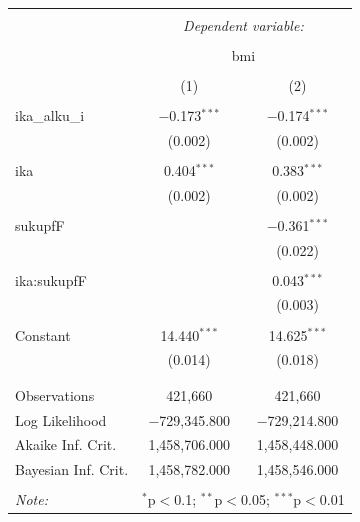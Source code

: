 \documentclass[finnish]{docopts}
\begin{document}
\nocite{*}
%
%
%




\lastpage

\appendices

\pagestyle{empty}


\begin{table}[!htbp] \centering 
  \caption{} 
  \label{} 
\begin{tabular}{@{\extracolsep{5pt}}lcc} 
\\[-1.8ex]\hline 
\hline \\[-1.8ex] 
 & \multicolumn{2}{c}{\textit{Dependent variable:}} \\ 
\cline{2-3} 
\\[-1.8ex] & \multicolumn{2}{c}{bmi} \\ 
\\[-1.8ex] & (1) & (2)\\ 
\hline \\[-1.8ex] 
 ika\_alku\_i & $-$0.173$^{***}$ & $-$0.174$^{***}$ \\ 
  & (0.002) & (0.002) \\ 
  & & \\ 
 ika & 0.404$^{***}$ & 0.383$^{***}$ \\ 
  & (0.002) & (0.002) \\ 
  & & \\ 
 sukupfF &  & $-$0.361$^{***}$ \\ 
  &  & (0.022) \\ 
  & & \\ 
 ika:sukupfF &  & 0.043$^{***}$ \\ 
  &  & (0.003) \\ 
  & & \\ 
 Constant & 14.440$^{***}$ & 14.625$^{***}$ \\ 
  & (0.014) & (0.018) \\ 
  & & \\ 
\hline \\[-1.8ex] 
Observations & 421,660 & 421,660 \\ 
Log Likelihood & $-$729,345.800 & $-$729,214.800 \\ 
Akaike Inf. Crit. & 1,458,706.000 & 1,458,448.000 \\ 
Bayesian Inf. Crit. & 1,458,782.000 & 1,458,546.000 \\ 
\hline 
\hline \\[-1.8ex] 
\textit{Note:}  & \multicolumn{2}{r}{$^{*}$p$<$0.1; $^{**}$p$<$0.05; $^{***}$p$<$0.01} \\ 
\end{tabular} 
\end{table} 
\end{document}

